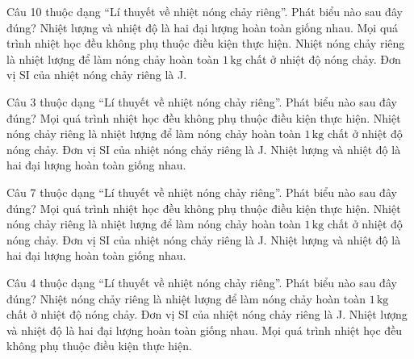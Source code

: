 \begin{ex}
Câu 10 thuộc dạng “Lí thuyết về nhiệt nóng chảy riêng”. Phát biểu nào sau đây đúng?
\choice
{Nhiệt lượng và nhiệt độ là hai đại lượng hoàn toàn giống nhau.}
{Mọi quá trình nhiệt học đều không phụ thuộc điều kiện thực hiện.}
{\True Nhiệt nóng chảy riêng là nhiệt lượng để làm nóng chảy hoàn toàn $1\,\text{kg}$ chất ở nhiệt độ nóng chảy.}
{Đơn vị SI của nhiệt nóng chảy riêng là J.}
\end{ex}

\begin{ex}
Câu 3 thuộc dạng “Lí thuyết về nhiệt nóng chảy riêng”. Phát biểu nào sau đây đúng?
\choice
{Mọi quá trình nhiệt học đều không phụ thuộc điều kiện thực hiện.}
{\True Nhiệt nóng chảy riêng là nhiệt lượng để làm nóng chảy hoàn toàn $1\,\text{kg}$ chất ở nhiệt độ nóng chảy.}
{Đơn vị SI của nhiệt nóng chảy riêng là J.}
{Nhiệt lượng và nhiệt độ là hai đại lượng hoàn toàn giống nhau.}
\end{ex}

\begin{ex}
Câu 7 thuộc dạng “Lí thuyết về nhiệt nóng chảy riêng”. Phát biểu nào sau đây đúng?
\choice
{Mọi quá trình nhiệt học đều không phụ thuộc điều kiện thực hiện.}
{\True Nhiệt nóng chảy riêng là nhiệt lượng để làm nóng chảy hoàn toàn $1\,\text{kg}$ chất ở nhiệt độ nóng chảy.}
{Đơn vị SI của nhiệt nóng chảy riêng là J.}
{Nhiệt lượng và nhiệt độ là hai đại lượng hoàn toàn giống nhau.}
\end{ex}

\begin{ex}
Câu 4 thuộc dạng “Lí thuyết về nhiệt nóng chảy riêng”. Phát biểu nào sau đây đúng?
\choice
{\True Nhiệt nóng chảy riêng là nhiệt lượng để làm nóng chảy hoàn toàn $1\,\text{kg}$ chất ở nhiệt độ nóng chảy.}
{Đơn vị SI của nhiệt nóng chảy riêng là J.}
{Nhiệt lượng và nhiệt độ là hai đại lượng hoàn toàn giống nhau.}
{Mọi quá trình nhiệt học đều không phụ thuộc điều kiện thực hiện.}
\end{ex}

